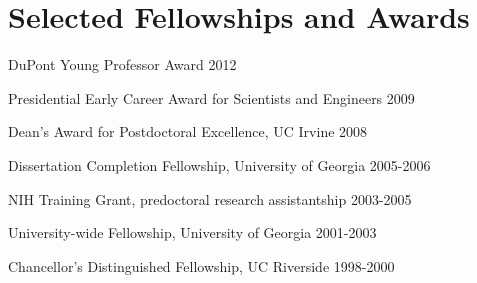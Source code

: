 \documentclass[letterpaper]{article}
\renewenvironment{itemize}{
  \begin{list}{}{
    \setlength{\leftmargin}{1.5em}
  }
}{
  \end{list}
}
\begin{document}
\section*{Selected Fellowships and Awards}
\begin {itemize}

\item DuPont Young Professor Award 2012 
\item Presidential Early Career Award for Scientists and Engineers 2009
\item Dean's Award for Postdoctoral Excellence, UC Irvine 2008
\item Dissertation Completion Fellowship, University of Georgia 2005-2006
\item NIH Training Grant, predoctoral research assistantship 2003-2005
\item University-wide Fellowship, University of Georgia 2001-2003
\item Chancellor's Distinguished Fellowship, UC Riverside 1998-2000
\end{itemize}

\end{document}
